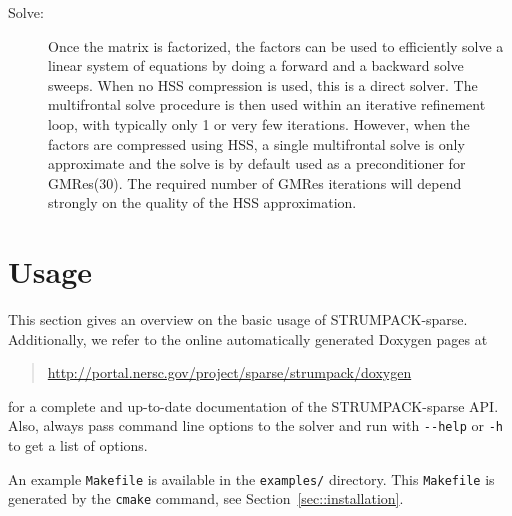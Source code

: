 \documentclass{article}
\begin{document}
\begin{description}
\item[Solve:] Once the matrix is factorized, the factors can be used to
  efficiently solve a linear system of equations by doing a forward
  and a backward solve sweeps. When no HSS compression is used, this is
  a direct solver. The multifrontal solve procedure is then used
  within an iterative refinement loop, with typically only 1 or very
  few iterations. However, when the factors are compressed using HSS,
  a single multifrontal solve is only approximate and the solve is by
  default used as a preconditioner for GMRes($30$). The required
  number of GMRes iterations will depend strongly on the quality of
  the HSS approximation.
\end{description}

\section{Usage}\label{sec:usage}
This section gives an overview on the basic usage of
STRUMPACK-sparse. Additionally, we refer to the online automatically
generated Doxygen pages at
\begin{quote}
  \url{http://portal.nersc.gov/project/sparse/strumpack/doxygen}
\end{quote}
for a complete and up-to-date documentation of the STRUMPACK-sparse
API. Also, always pass command line options to the solver and run with
\lstinline[style=Bash]!--help! or \lstinline[style=Bash]!-h! to get a
list of options.

An example \lstinline[style=Bash]!Makefile! is available in the
\lstinline[style=Bash]!examples/! directory. This
\lstinline[style=Bash]!Makefile! is generated by the
\lstinline[style=Bash]!cmake! command, see
Section~\ref{sec::installation}.
\end{document}
